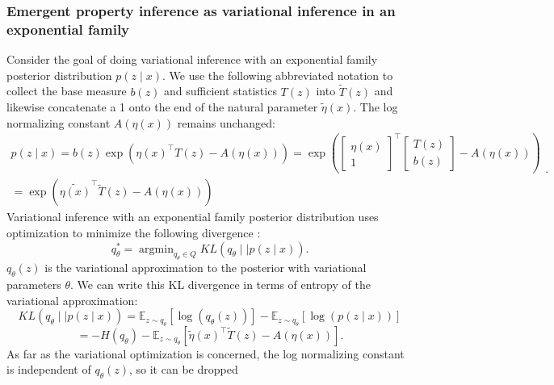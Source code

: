 \documentclass[11pt]{article}
\DeclareMathOperator*{\argmin}{argmin}
\begin{document}
\subsubsection{Emergent property inference as variational inference in an exponential family}\label{methods_VI}
Consider the goal of doing variational inference with an exponential family posterior distribution $p(z \mid x)$.  We use the following abbreviated notation to collect the base measure $b(z)$ and sufficient statistics $T(z)$ into $\tilde{T}(z)$ and likewise concatenate a 1 onto the end of the natural parameter $\tilde{\eta}(x)$.  The log normalizing constant $A(\eta(x))$ remains unchanged:
\begin{equation}
\begin{split}
p(z \mid x) = b(z) \exp{\left( \eta(x)^\top T(z) - A(\eta(x)) \right)} = \exp{\left( \begin{bmatrix} \eta(x) \\ 1 \end{bmatrix}^\top \begin{bmatrix} T(z) \\ b(z) \end{bmatrix} - A(\eta(x)) \right)} \\= \exp{\left(\tilde{\eta(x)}^\top \tilde{T}(z) - A(\eta(x)) \right)} 
\end{split}.
\end{equation}
Variational inference with an exponential family posterior distribution uses optimization to minimize the following divergence \cite{blei2017variational}:
\begin{equation}
q_\theta^* = \argmin_{q_\theta \in Q} KL(q_\theta \mid \mid p(z \mid x)).
\end{equation}
$q_\theta(z)$ is the variational approximation to the posterior with variational parameters $\theta$.  We can write this KL divergence in terms of entropy of the variational approximation:
\begin{equation}
KL(q_\theta \mid \mid p(z \mid x)) = \mathbb{E}_{z \sim q_\theta} \left[ \log (q_\theta(z)) \right] - \mathbb{E}_{z \sim q_\theta} \left[ \log (p(z \mid x)) \right]
\end{equation}
\begin{equation}
 = -H(q_\theta) - \mathbb{E}_{z \sim q_\theta} \left[ \tilde{\eta}(x)^\top  \tilde{T}(z) - A(\eta(x)) \right].
\end{equation}
As far as the variational optimization is concerned, the log normalizing constant is independent of $q_\theta(z)$, so it can be dropped
\end{document}
